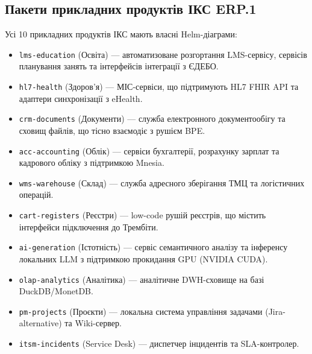 \subsection{Пакети прикладних продуктів ІКС ERP.1}
Усі 10 прикладних продуктів ІКС мають власні Helm-діаграми:
\begin{itemize}
    \item \texttt{lms-education} (Освіта) --- автоматизоване розгортання LMS-сервісу, сервісів планування занять та інтерфейсів інтеграції з ЄДЕБО.
    \item \texttt{hl7-health} (Здоров'я) --- МІС-сервіси, що підтримують HL7 FHIR API та адаптери синхронізації з eHealth.
    \item \texttt{crm-documents} (Документи) --- служба електронного документообігу та сховищ файлів, що тісно взаємодіє з рушієм BPE.
    \item \texttt{acc-accounting} (Облік) --- сервіси бухгалтерії, розрахунку зарплат та кадрового обліку з підтримкою Mnesia.
    \item \texttt{wms-warehouse} (Склад) --- служба адресного зберігання ТМЦ та логістичних операцій.
    \item \texttt{cart-registers} (Реєстри) --- low-code рушій реєстрів, що містить інтерфейси підключення до Трембіти.
    \item \texttt{ai-generation} (Істотність) --- сервіс семантичного аналізу та інференсу локальних LLM з підтримкою прокидання GPU (NVIDIA CUDA).
    \item \texttt{olap-analytics} (Аналітика) --- аналітичне DWH-сховище на базі DuckDB/MonetDB.
    \item \texttt{pm-projects} (Проєкти) --- локальна система управління задачами (Jira-alternative) та Wiki-сервер.
    \item \texttt{itsm-incidents} (Service Desk) --- диспетчер інцидентів та SLA-контролер.
\end{itemize}

